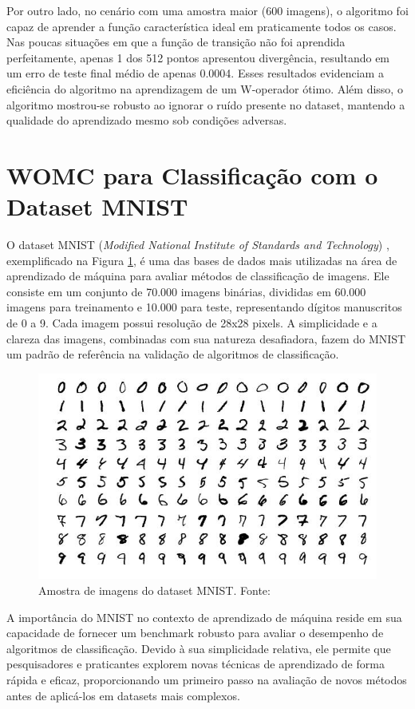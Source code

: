 Por outro lado, no cenário com uma amostra maior (600 imagens), o algoritmo foi capaz de aprender a função característica ideal em praticamente todos os casos. Nas poucas situações em que a função de transição não foi aprendida perfeitamente, apenas 1 dos 512 pontos apresentou divergência, resultando em um erro de teste final médio de apenas 0.0004. Esses resultados evidenciam a eficiência do algoritmo na aprendizagem de um W-operador ótimo. Além disso, o algoritmo mostrou-se robusto ao ignorar o ruído presente no dataset, mantendo a qualidade do aprendizado mesmo sob condições adversas.

\section{WOMC para Classificação com o Dataset MNIST}
\label{sec:mnist}

O dataset MNIST (\textit{Modified National Institute of Standards and Technology}) \cite{MNIST:dataset}, exemplificado na Figura \ref{fig:mnist}, é uma das bases de dados mais utilizadas na área de aprendizado de máquina para avaliar métodos de classificação de imagens. Ele consiste em um conjunto de 70.000 imagens binárias, divididas em 60.000 imagens para treinamento e 10.000 para teste, representando dígitos manuscritos de 0 a 9. Cada imagem possui resolução de 28x28 pixels. A simplicidade e a clareza das imagens, combinadas com sua natureza desafiadora, fazem do MNIST um padrão de referência na validação de algoritmos de classificação.

\begin{figure}
    \centering
    \includegraphics[width=.8\textwidth]{figuras/MNIST_ex.jpg}
    \caption{Amostra de imagens do dataset MNIST. Fonte: \cite{wikipedia_mnist}}
    \label{fig:mnist}
\end{figure}


A importância do MNIST no contexto de aprendizado de máquina reside em sua capacidade de fornecer um benchmark robusto para avaliar o desempenho de algoritmos de classificação. Devido à sua simplicidade relativa, ele permite que pesquisadores e praticantes explorem novas técnicas de aprendizado de forma rápida e eficaz, proporcionando um primeiro passo na avaliação de novos métodos antes de aplicá-los em datasets mais complexos.

